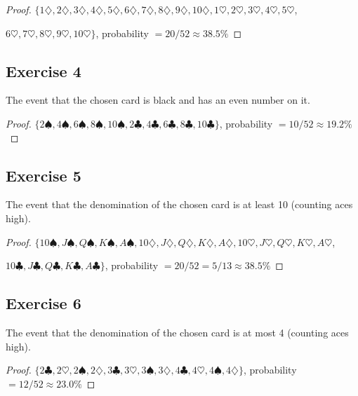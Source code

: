\documentclass[14pt]{extarticle}
\begin{document}
\begin{proof}
     \(\{1\diamondsuit, 2\diamondsuit, 3\diamondsuit, 4\diamondsuit, 5\diamondsuit, 6\diamondsuit, 7\diamondsuit,
     8\diamondsuit, 9\diamondsuit, 10\diamondsuit, 1\heartsuit, 2\heartsuit, 3\heartsuit, 4\heartsuit, 5\heartsuit\),

     \(6\heartsuit, 7\heartsuit, 8\heartsuit, 9\heartsuit, 10\heartsuit\}\), probability \(= 20/52 \approx 38.5\%\)
\end{proof}

\subsection{Exercise 4}
The event that the chosen card is black and has an even number on it.

\begin{proof}
     \(\{2\spadesuit, 4\spadesuit, 6\spadesuit, 8\spadesuit, 10\spadesuit, 2\clubsuit, 4\clubsuit, 6\clubsuit,
     8\clubsuit, 10\clubsuit\}\), probability \(= 10/52 \approx 19.2\%\)
\end{proof}

\subsection{Exercise 5}
The event that the denomination of the chosen card is at least 10 (counting aces high).

\begin{proof}
     \(\{10\spadesuit, J\spadesuit, Q\spadesuit, K\spadesuit, A\spadesuit, 10\diamondsuit, J\diamondsuit, Q\diamondsuit,
     K\diamondsuit, A\diamondsuit, 10\heartsuit, J\heartsuit, Q\heartsuit, K\heartsuit, A\heartsuit\),

     \(10\clubsuit, J\clubsuit, Q\clubsuit, K\clubsuit, A\clubsuit\}\), probability \(= 20/52=5/13 \approx 38.5\%\)
\end{proof}

\subsection{Exercise 6}
The event that the denomination of the chosen card is at most 4 (counting aces high).

\begin{proof}
     \(\{2\clubsuit, 2\heartsuit, 2\spadesuit, 2\diamondsuit, 3\clubsuit, 3\heartsuit, 3\spadesuit, 3\diamondsuit,
     4\clubsuit, 4\heartsuit, 4\spadesuit, 4\diamondsuit\}\), probability \(= 12/52 \approx 23.0\%\)
\end{proof}
\end{document}
